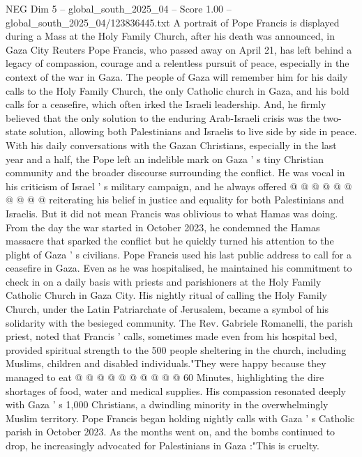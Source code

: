 \begin{textsample}{NEG Dim 5 – global\_south\_2025\_04 – Score 1.00 – global\_south\_2025\_04/123836445.txt}  \label{ex:f5_neg_398}
A portrait of Pope Francis is displayed during a Mass at the Holy Family Church, after his death was announced, in Gaza City Reuters Pope Francis, who passed away on April 21, has left behind a legacy of compassion, courage and a relentless pursuit of peace, especially in the context of the war in Gaza.
The people of Gaza will remember him for his daily calls to the Holy Family Church, the only Catholic church in Gaza, and his bold calls for a ceasefire, which often irked the Israeli leadership.
And, he firmly believed that the only solution to the enduring Arab-Israeli crisis was the two-state solution, allowing both Palestinians and Israelis to live side by side in peace.
With his daily conversations with the Gazan Christians, especially in the last year and a half, the Pope left an indelible mark on Gaza ' s tiny Christian community and the broader discourse surrounding the conflict.
He was vocal in his criticism of Israel ' s military campaign, and he always offered @ @ @ @ @ @ @ @ @ @ reiterating his belief in justice and equality for both Palestinians and Israelis.
But it did not mean Francis was oblivious to what Hamas was doing.
From the day the war started in October 2023, he condemned the Hamas massacre that sparked the conflict but he quickly turned his attention to the plight of Gaza ' s civilians.
Pope Francis used his last public address to call for a ceasefire in Gaza.
Even as he was hospitalised, he maintained his commitment to check in on a daily basis with priests and parishioners at the Holy Family Catholic Church in Gaza City.
His nightly ritual of calling the Holy Family Church, under the Latin Patriarchate of Jerusalem, became a symbol of his solidarity with the besieged community.
The Rev.
Gabriele Romanelli, the parish priest, noted that Francis ' calls, sometimes made even from his hospital bed, provided spiritual strength to the 500 people sheltering in the church, including Muslims, children and disabled individuals."They were happy because they managed to eat @ @ @ @ @ @ @ @ @ @ 60 Minutes, highlighting the dire shortages of food, water and medical supplies.
His compassion resonated deeply with Gaza ' s 1,000 Christians, a dwindling minority in the overwhelmingly Muslim territory.
Pope Francis began holding nightly calls with Gaza ' s Catholic parish in October 2023.
As the months went on, and the bombs continued to drop, he increasingly advocated for Palestinians in Gaza :"This is cruelty.

\end{textsample}
